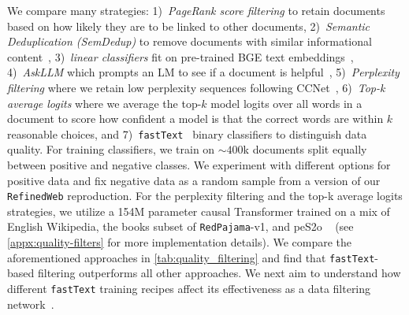 We compare many strategies:
1)~\emph{PageRank score filtering} to retain documents based on how likely they are to be linked to other documents,
2)~\emph{Semantic Deduplication (SemDedup)} to remove documents with similar informational content~\citep{abbas2023semdedup},
3)~\emph{linear classifiers} fit on pre-trained BGE text embeddings~\citep{bge_embedding},
4)~\emph{AskLLM} which prompts an LM to see if a document is helpful~\citep{sachdeva2024train},
5)~\emph{Perplexity filtering} where we retain low perplexity sequences following CCNet~\citep{wenzek-etal-2020-ccnet},
6)~\emph{Top-k average logits} where we average the top-$k$ model logits over all words in a document to score how confident a model is that the correct words are within $k$ reasonable choices, and
7)~\texttt{fastText}~\citep{joulin2017bag} binary classifiers to distinguish data quality. For training classifiers, we train on $\sim 400$k documents split equally between positive and negative classes. We experiment with different options for positive data and fix negative data as a random sample from a version of our \texttt{RefinedWeb} reproduction. For the perplexity filtering and the top-k average logits strategies, we utilize a 154M parameter causal Transformer trained on a mix of English Wikipedia, the books subset of \texttt{RedPajama}-v1, and peS2o ~\citep{peS2o, rpj} (see \ref{appx:quality-filters} for more implementation details). We compare the aforementioned approaches in \ref{tab:quality_filtering} and find that \texttt{fastText}-based filtering outperforms all other approaches. We next aim to understand how different \texttt{fastText} training recipes affect its effectiveness as a data filtering network~\citep{fang2023dfn}.

